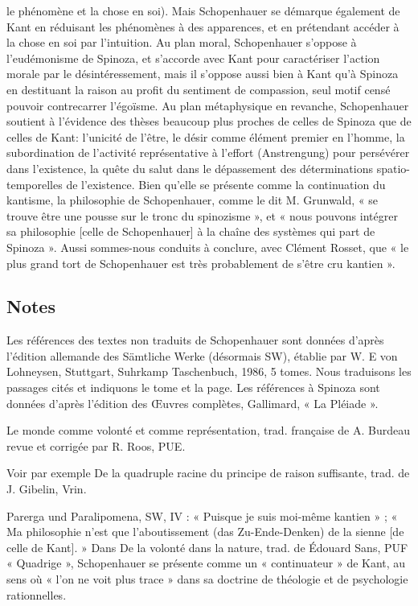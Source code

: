le phénomène et la chose en soi). Mais Schopenhauer se démarque également de Kant en réduisant les
phénomènes à des apparences, et en prétendant accéder à la chose en soi par l’intuition.
Au plan moral, Schopenhauer s’oppose à l’eudémonisme de Spinoza, et s’accorde avec Kant pour
caractériser l’action morale par le désintéressement, mais il s’oppose aussi bien à Kant qu’à Spinoza en
destituant la raison au profit du sentiment de compassion, seul motif censé pouvoir contrecarrer l’égoïsme.
Au plan métaphysique en revanche, Schopenhauer soutient à l’évidence des thèses beaucoup plus proches
de celles de Spinoza que de celles de Kant: l’unicité de l’être, le désir comme élément premier en l’homme,
la subordination de l’activité représentative à l’effort (Anstrengung) pour persévérer dans l’existence, la
quête du salut dans le dépassement des déterminations spatio-temporelles de l’existence.
Bien qu’elle se présente comme la continuation du kantisme, la philosophie de Schopenhauer, comme le
dit M. Grunwald, « se trouve être une pousse sur le tronc du spinozisme », et « nous pouvons intégrer sa
philosophie [celle de Schopenhauer] à la chaîne des systèmes qui part de Spinoza ». Aussi sommes-nous
conduits à conclure, avec Clément Rosset, que « le plus grand tort de Schopenhauer est très probablement de
s’être cru kantien ».

\subsection{Notes}

Les références des textes non traduits de Schopenhauer sont données d’après l’édition allemande des
Sämtliche Werke (désormais SW), établie par W. E von Lohneysen, Stuttgart, Suhrkamp Taschenbuch, 1986,
5 tomes. Nous traduisons les passages cités et indiquons le tome et la page. Les références à Spinoza sont
données d’après l’édition des Œuvres complètes, Gallimard, « La Pléiade ».

Le monde comme volonté et comme représentation, trad. française de A. Burdeau
revue et corrigée par R. Roos, PUE.

Voir par exemple De la quadruple racine du principe de raison suffisante, trad. de J. Gibelin, Vrin.

Parerga und Paralipomena, SW, IV : « Puisque je suis moi-même kantien » ;  « Ma
philosophie n’est que l’aboutissement (das Zu-Ende-Denken) de la sienne [de celle de Kant]. » Dans De la
volonté dans la nature, trad. de Édouard Sans, PUF « Quadrige », Schopenhauer se
présente comme un « continuateur » de Kant, au sens où « l’on ne voit plus trace » dans sa doctrine de
théologie et de psychologie rationnelles.
 
